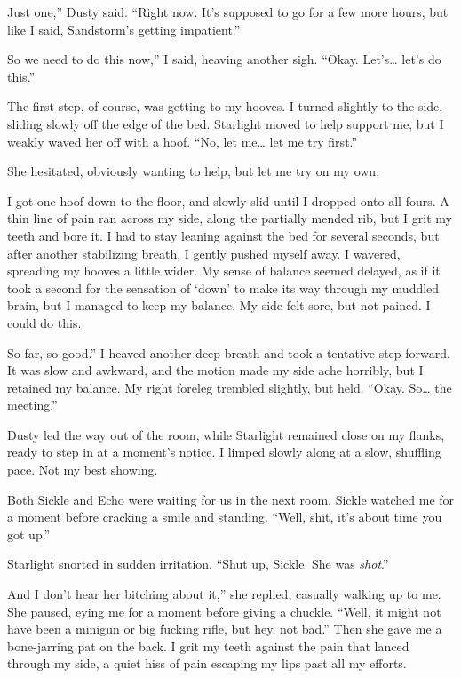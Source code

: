 \leavevmode{}Just one,” Dusty said. “Right now. It’s supposed to go for a few more hours, but like I said, Sandstorm’s getting impatient.”

\leavevmode{}So we need to do this now,” I said, heaving another sigh. “Okay. Let’s… let’s do this.”

The first step, of course, was getting to my hooves. I turned slightly to the side, sliding slowly off the edge of the bed. Starlight moved to help support me, but I weakly waved her off with a hoof. “No, let me… let me try first.”

She hesitated, obviously wanting to help, but let me try on my own.

I got one hoof down to the floor, and slowly slid until I dropped onto all fours. A thin line of pain ran across my side, along the partially mended rib, but I grit my teeth and bore it. I had to stay leaning against the bed for several seconds, but after another stabilizing breath, I gently pushed myself away. I wavered, spreading my hooves a little wider. My sense of balance seemed delayed, as if it took a second for the sensation of ‘down’ to make its way through my muddled brain, but I managed to keep my balance. My side felt sore, but not pained. I could do this.

\leavevmode{}So far, so good.” I heaved another deep breath and took a tentative step forward. It was slow and awkward, and the motion made my side ache horribly, but I retained my balance. My right foreleg trembled slightly, but held. “Okay. So… the meeting.”

Dusty led the way out of the room, while Starlight remained close on my flanks, ready to step in at a moment’s notice. I limped slowly along at a slow, shuffling pace. Not my best showing.

Both Sickle and Echo were waiting for us in the next room. Sickle watched me for a moment before cracking a smile and standing. “Well, shit, it’s about time you got up.”

Starlight snorted in sudden irritation. “Shut up, Sickle. She was \textit{shot}.”

\leavevmode{}And I don’t hear her bitching about it,” she replied, casually walking up to me. She paused, eying me for a moment before giving a chuckle. “Well, it might not have been a minigun or big fucking rifle, but hey, not bad.” Then she gave me a bone-jarring pat on the back. I grit my teeth against the pain that lanced through my side, a quiet hiss of pain escaping my lips past all my efforts.

